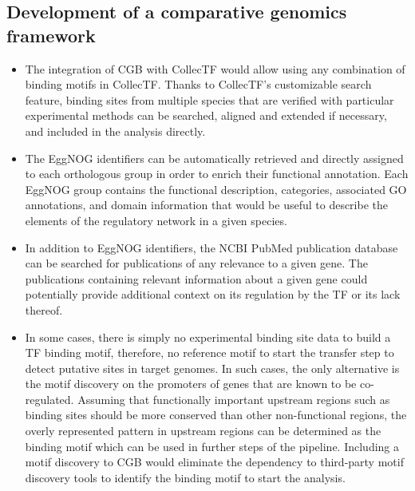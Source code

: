 \documentclass[12pt]{article}
\begin{document}
\subsection{Development of a comparative genomics framework}

\begin{itemize}
\item The integration of CGB with CollecTF would allow using any combination of
  binding motifs in CollecTF\@. Thanks to CollecTF's customizable search feature,
  binding sites from multiple species that are verified with particular
  experimental methods can be searched, aligned and extended if necessary, and
  included in the analysis directly.

\item The EggNOG identifiers can be automatically retrieved and directly
  assigned to each orthologous group in order to enrich their functional
  annotation. Each EggNOG group contains the functional description,
  categories, associated GO annotations, and domain information that would be
  useful to describe the elements of the regulatory network in a given species.

\item In addition to EggNOG identifiers, the NCBI PubMed publication database
  can be searched for publications of any relevance to a given gene. The
  publications containing relevant information about a given gene could
  potentially provide additional context on its regulation by the TF or its
  lack thereof.

\item In some cases, there is simply no experimental binding site data to build
  a TF binding motif, therefore, no reference motif to start the transfer step
  to detect putative sites in target genomes. In such cases, the only
  alternative is the motif discovery on the promoters of genes that are known
  to be co-regulated. Assuming that functionally important upstream regions
  such as binding sites should be more conserved than other non-functional
  regions, the overly represented pattern in upstream regions can be determined
  as the binding motif which can be used in further steps of the
  pipeline. Including a motif discovery to CGB would eliminate the dependency
  to third-party motif discovery tools to identify the binding motif to start
  the analysis.

\end{itemize}
\end{document}
